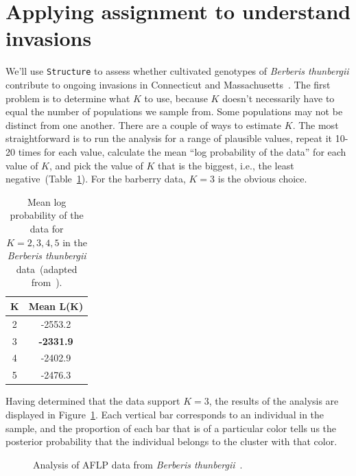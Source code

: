 \documentclass[12pt]{article}
\begin{document}
\section*{Applying assignment to understand invasions}

We'll use {\tt Structure} to assess whether
cultivated genotypes of {\it Berberis thunbergii\/} contribute to
ongoing invasions in Connecticut and
Massachusetts~\cite{Lubell-etal-2008}. The first problem is to determine what $K$
to use, because $K$ doesn't necessarily have to equal the number of
populations we sample from. Some populations may not be distinct from
one another. There are a couple of ways to estimate $K$. The most
straightforward is to run the analysis for a range of plausible
values, repeat it 10-20 times for each value, calculate the mean ``log
probability of the data'' for each value of $K$, and pick the value of
$K$ that is the biggest, i.e., the least
negative~(Table~\ref{table:berberis-k}). For the barberry data, $K=3$
is the obvious choice.

\begin{table}
\begin{center}
\begin{tabular}{cc}
\hline\hline
K & Mean L(K) \\
\hline
2 & -2553.2 \\
3 & {\bf -2331.9} \\
4 & -2402.9 \\
5 & -2476.3 \\
\hline
\end{tabular}
\end{center}
\caption{Mean log probability of the data for $K=2,3,4,5$ in the {\it
    Berberis thunbergii\/} data~(adapted
  from~\cite{Lubell-etal-2008}).}\label{table:berberis-k}
\end{table}

Having determined that the data support $K=3$, the results of the
analysis are displayed in Figure~\ref{fig:lubell-structure}. Each
vertical bar corresponds to an individual in the sample, and the
proportion of each bar that is of a particular color tells us the
posterior probability that the individual belongs to the cluster with
that color.

\begin{figure}
\caption{Analysis of AFLP data from {\it Berberis
    thunbergii}~\cite{Lubell-etal-2008}.}\label{fig:lubell-structure} 
\end{figure}
\end{document}
